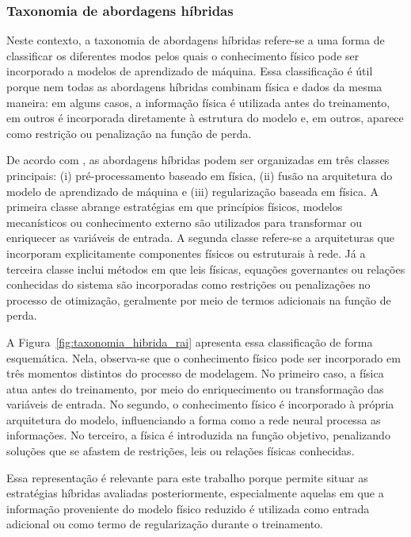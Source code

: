 \subsubsection{Taxonomia de abordagens híbridas}
\label{subsec:taxonomia-hibrida}

Neste contexto, a taxonomia de abordagens híbridas refere-se a uma forma de classificar os diferentes modos pelos quais o conhecimento físico pode ser incorporado a modelos de aprendizado de máquina. Essa classificação é útil porque nem todas as abordagens híbridas combinam física e dados da mesma maneira: em alguns casos, a informação física é utilizada antes do treinamento, em outros é incorporada diretamente à estrutura do modelo e, em outros, aparece como restrição ou penalização na função de perda.

De acordo com \cite{rai2020hybrid}, as abordagens híbridas podem ser organizadas em três classes principais: (i) pré-processamento baseado em física, (ii) fusão na arquitetura do modelo de aprendizado de máquina e (iii) regularização baseada em física. A primeira classe abrange estratégias em que princípios físicos, modelos mecanísticos ou conhecimento externo são utilizados para transformar ou enriquecer as variáveis de entrada. A segunda classe refere-se a arquiteturas que incorporam explicitamente componentes físicos ou estruturais à rede. Já a terceira classe inclui métodos em que leis físicas, equações governantes ou relações conhecidas do sistema são incorporadas como restrições ou penalizações no processo de otimização, geralmente por meio de termos adicionais na função de perda.

A Figura~\ref{fig:taxonomia_hibrida_rai} apresenta essa classificação de forma esquemática. Nela, observa-se que o conhecimento físico pode ser incorporado em três momentos distintos do processo de modelagem. No primeiro caso, a física atua antes do treinamento, por meio do enriquecimento ou transformação das variáveis de entrada. No segundo, o conhecimento físico é incorporado à própria arquitetura do modelo, influenciando a forma como a rede neural processa as informações. No terceiro, a física é introduzida na função objetivo, penalizando soluções que se afastem de restrições, leis ou relações físicas conhecidas.

Essa representação é relevante para este trabalho porque permite situar as estratégias híbridas avaliadas posteriormente, especialmente aquelas em que a informação proveniente do modelo físico reduzido é utilizada como entrada adicional ou como termo de regularização durante o treinamento.

